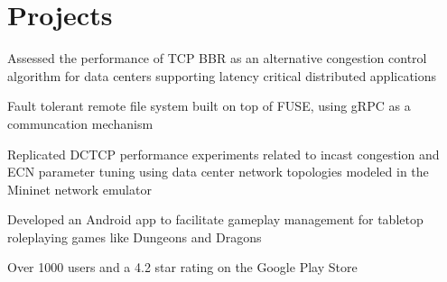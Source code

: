 \documentclass[]{chowes-resume}
\begin{document}
\begin{minipage}[t]{0.66\textwidth}

\section{Projects}

\begin{tightemize}
\item Assessed the performance of TCP BBR as an alternative congestion control algorithm for data centers supporting latency critical distributed applications 
\end{tightemize}
\sectionsep

\begin{tightemize}
\item Fault tolerant remote file system built on top of FUSE, using gRPC as a communcation mechanism
\end{tightemize}
\sectionsep

\begin{tightemize}
\item Replicated DCTCP performance experiments related to incast congestion and ECN parameter tuning using data center network topologies modeled in the Mininet network emulator
\end{tightemize}
\sectionsep

\begin{tightemize}
\item Developed an Android app to facilitate gameplay management for tabletop roleplaying games like Dungeons and Dragons
\item Over 1000 users and a 4.2 star rating on the Google Play Store
\end{tightemize}
\sectionsep

\end{minipage} 
\end{document}
